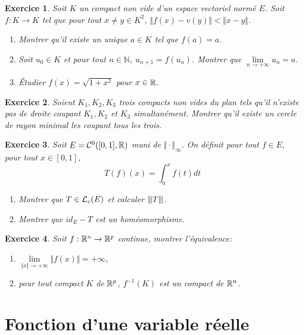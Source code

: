 \documentclass[12pt]{article}
\newtheorem{exercise}{Exercice}[section]
\theoremstyle{remark}
\theoremstyle{remark}
\newcommand{\N}{\mathbb{N}} \newcommand{\Z}{\mathbb{Z}}
\newcommand{\vertiii}[1]{{\left\vert\kern-0.25ex\left\vert\kern-0.25ex\left\vert{}#1
\right\vert\kern-0.25ex\right\vert\kern-0.25ex\right\vert}}
\begin{document}
\begin{exercise}
	Soit $K$ un compact non vide d'un espace vectoriel normé $E$. Soit $f\colon K\to K$ tel que pour tout $x\neq y\in K^{2}$, $\Vert f(x)-v(y)\Vert<\Vert x-y\Vert$.
	\begin{enumerate}
		\item Montrer qu'il existe un unique $a\in K$ tel que $f(a)=a$.
		\item Soit $u_{0}\in K$ et pour tout $n\in\N$, $u_{n+1}=f(u_{n})$. Montrer que $\lim\limits_{n\to+\infty}u_{n}=a$.
		\item Étudier $f(x)=\sqrt{1+x^{2}}$ pour $x\in\mathbb{R}$.
	\end{enumerate}
\end{exercise}

\begin{exercise}
	Soient $K_{1},K_{2},K_{3}$ trois compacts non vides du plan tels qu'il n'existe pas de droite coupant $K_{1},K_{2}$ et $K_{3}$ simultanément. Montrer qu'il existe un cercle de rayon minimal les coupant tous les trois.
\end{exercise}

\begin{exercise}
	Soit $E=\mathcal{C}^{0}([0,1],\mathbb{R})$ muni de $\Vert\cdot\Vert_{\infty}$. On définit pour tout $f\in E$, pour tout $x\in[0,1]$, 
	$$T(f)(x)=\int_{0}^{x}f(t)dt$$
	\begin{enumerate}
		\item Montrer que $T\in\mathcal{L}_{c}(E)$ et calculer $\vertiii{T}$.
		\item Montrer que $id_{E}-T$ est un homéomorphisme.
	\end{enumerate}
\end{exercise}

\begin{exercise}
	Soit $f:\mathbb{R}^{n}\to\mathbb{R}^{p}$ continue, montrer l'équivalence:
	\begin{enumerate}
		\item [(i)] $\lim\limits_{\Vert x\Vert\to+\infty}\Vert f(x)\Vert=+\infty$,
		\item [(ii)] pour tout compact $K$ de $\mathbb{R}^{p}$, $f^{-1}(K)$ est un compact de $\mathbb{R}^{n}$.
	\end{enumerate}
\end{exercise}

\cleardoublepage
\section{Fonction d'une variable réelle}
\end{document}
